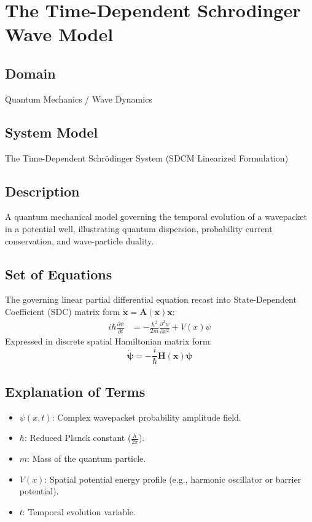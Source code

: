 \chapter{The Time-Dependent Schrodinger Wave Model}

\section{Domain}
Quantum Mechanics / Wave Dynamics

\section{System Model}
The Time-Dependent Schrödinger System (SDCM Linearized Formulation)

\section{Description}
A quantum mechanical model governing the temporal evolution of a wavepacket in a potential well, illustrating quantum dispersion, probability current conservation, and wave-particle duality.

\section{Set of Equations}
The governing linear partial differential equation recast into State-Dependent Coefficient (SDC) matrix form $\dot{\mathbf{x}} = \mathbf{A}(\mathbf{x})\mathbf{x}$:
\begin{align}
i \hbar \frac{\partial \psi}{\partial t} &= -\frac{\hbar^2}{2m} \frac{\partial^2 \psi}{\partial x^2} + V(x)\psi
\end{align}
Expressed in discrete spatial Hamiltonian matrix form:
\begin{equation}
\dot{\boldsymbol{\psi}} = -\frac{i}{\hbar} \mathbf{H}(\mathbf{x}) \boldsymbol{\psi}
\end{equation}

\section{Explanation of Terms}
\begin{itemize}
    \item $\psi(x, t)$: Complex wavepacket probability amplitude field.
    \item $\hbar$: Reduced Planck constant ($\frac{h}{2\pi}$).
    \item $m$: Mass of the quantum particle.
    \item $V(x)$: Spatial potential energy profile (e.g., harmonic oscillator or barrier potential).
    \item $t$: Temporal evolution variable.
\end{itemize}

